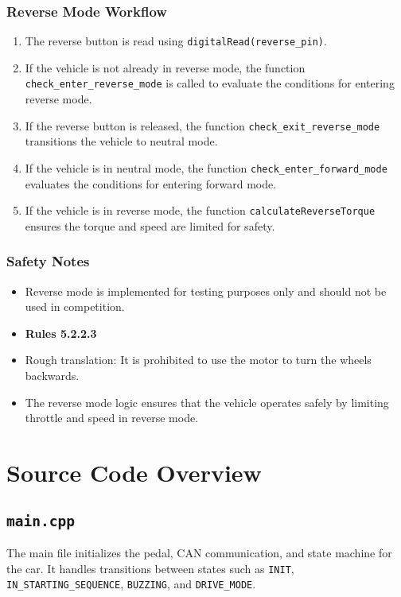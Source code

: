 \documentclass[a4paper,12pt]{article}
\begin{document}
\subsubsection{Reverse Mode Workflow}
\begin{enumerate}
    \item The reverse button is read using \texttt{digitalRead(reverse\_pin)}.
    \item If the vehicle is not already in reverse mode, the function \texttt{check\_enter\_reverse\_mode} is called to evaluate the conditions for entering reverse mode.
    \item If the reverse button is released, the function \texttt{check\_exit\_reverse\_mode} transitions the vehicle to neutral mode.
    \item If the vehicle is in neutral mode, the function \texttt{check\_enter\_forward\_mode} evaluates the conditions for entering forward mode.
    \item If the vehicle is in reverse mode, the function \texttt{calculateReverseTorque} ensures the torque and speed are limited for safety.
\end{enumerate}

\subsubsection{Safety Notes}
\begin{itemize}
    \item Reverse mode is implemented for testing purposes only and should not be used in competition.
    \item \textbf{Rules 5.2.2.3}
    \item Rough translation: It is prohibited to use the motor to turn the wheels backwards.
    \item The reverse mode logic ensures that the vehicle operates safely by limiting throttle and speed in reverse mode.
\end{itemize}

\section{Source Code Overview}
\subsection{\texttt{main.cpp}}
The main file initializes the pedal, CAN communication, and state machine for the car. It handles transitions between states such as \texttt{INIT}, \texttt{IN\_STARTING\_SEQUENCE}, \texttt{BUZZING}, and \texttt{DRIVE\_MODE}.
\end{document}
